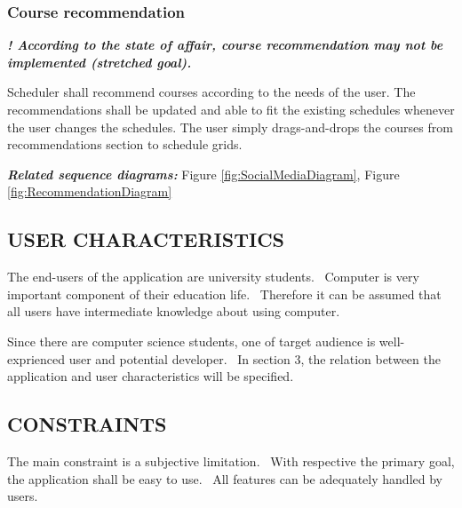 \documentclass[twoside,letterpaper]{article}
\begin{document}
\subsubsection[Course 
recommendation]{\rmfamily\bfseries\color{black}
	Course recommendation}
{\noindent{}\color{black}
	\textbf{\emph{! According to the state of affair, course recommendation may not be implemented (stretched goal).}}}
	
\smallskip

{\color{black}
	Scheduler shall recommend courses according to the needs of the user. The recommendations shall be updated and able to fit the existing schedules whenever the user changes the schedules. The user simply drags-and-drops the courses from recommendations section to schedule grids.}
	
\smallskip

{\color{black}
\emph{\textbf{Related sequence diagrams:}} Figure \ref{fig:SocialMediaDiagram}, Figure \ref{fig:RecommendationDiagram}}

\subsection[USER
CHARACTERISTICS]{\rmfamily\bfseries\color{black}
USER CHARACTERISTICS}

{\color{black}
The end-users of the application are university students. \ Computer is very important component of their education life. \ Therefore it can be assumed that all users have intermediate knowledge about using computer.}

\smallskip

{ \noindent {}\color{black}
Since there are computer science students, one of target audience is well-exprienced user and potential developer. \ In section 3, the relation between the application and user characteristics will be specified.}

\subsection[CONSTRAINTS]{\rmfamily\bfseries\color{black}
CONSTRAINTS}

{\color{black}
The main constraint is a subjective limitation. \ With respective the primary goal, the application shall be easy to use. \ All features can be adequately handled by users. 
}
\end{document}
